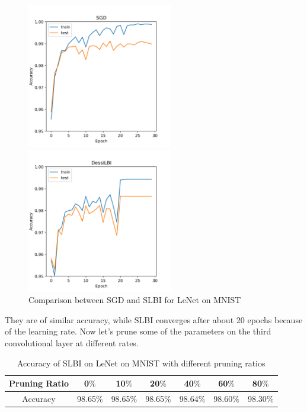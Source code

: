 \documentclass[a4paper, 11pt]{article} %
\begin{document}
\begin{figure}[H]
	\begin{minipage}[t]{0.48\textwidth}
		\centering
		\includegraphics[width=2.5in]{./img/train-sgd.png}
	\end{minipage}
	\begin{minipage}[t]{0.48\textwidth}
		\centering
		\includegraphics[width=2.5in]{./img/train-sbli.png}
	\end{minipage}
	\caption{Comparison between SGD and SLBI for LeNet on MNIST}
\end{figure}

They are of similar accuracy, while SLBI converges after about 20 epochs because of the
learning rate. Now let's prune some of the parameters on the third convolutional layer
at different rates.

\begin{table}[H]
	\begin{center}
		\begin{tabular}{ccccccc}
			\toprule
			Pruning Ratio & 0$\%$     & 10$\%$    & 20$\%$    & 40$\%$    & 60$\%$    & 80$\%$    \\
			\midrule
			Accuracy      & 98.65$\%$ & 98.65$\%$ & 98.65$\%$ & 98.64$\%$ & 98.60$\%$ & 98.30$\%$ \\
			\bottomrule
		\end{tabular}
		\caption{Accuracy of SLBI on LeNet on MNIST with different pruning ratios}
	\end{center}
\end{table}
\end{document}
